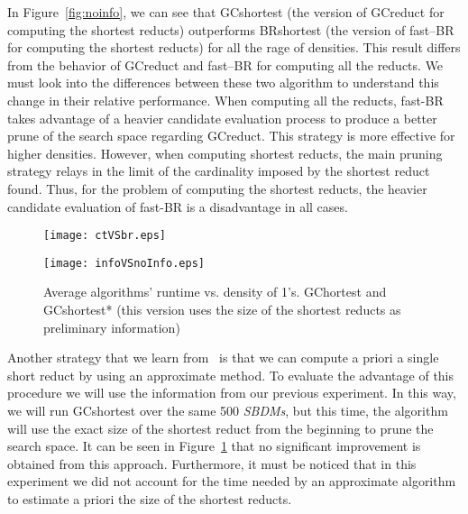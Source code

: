 \documentclass[authoryear,11pt]{elsarticle}
\begin{document}
  In Figure~\ref{fig:noinfo}, we can see that GCshortest (the version of GCreduct for computing the shortest reducts) outperforms BRshortest (the version of fast--BR for computing the shortest reducts) for all the rage of densities. This result differs from the behavior of GCreduct and fast--BR for computing all the reducts. We must look into the differences between these two algorithm to understand this change in their relative performance. When computing all the reducts, fast-BR takes advantage of a heavier candidate evaluation process to produce a better prune of the search space regarding GCreduct. This strategy is more effective for higher densities. However, when computing shortest reducts, the main pruning strategy relays in the limit of the cardinality imposed by the shortest reduct found. Thus, for the problem of computing the shortest reducts, the heavier candidate evaluation of fast-BR is a disadvantage in all cases.
  
  \begin{figure}[htb]
	  \begin{minipage}{.48\linewidth}  	
	  	\begin{center}
	  		\texttt{[image: ctVSbr.eps]}
	  	\end{center}
	  	\caption{Average algorithms' runtime vs. density of 1's.  ~~~~~~ GCshortest and BRshortest.\bigskip}
	  	\label{fig:noinfo}
	  \end{minipage}
	  \begin{minipage}{.48\linewidth}  
	  	\begin{center}
	  		\texttt{[image: infoVSnoInfo.eps]}
	  	\end{center}
	  	\caption{Average algorithms' runtime vs. density of 1's. GChortest and GCshortest* (this version uses the size of the shortest reducts as preliminary information)}
	  	\label{fig:info}
	  \end{minipage}
  \end{figure}  

 Another strategy that we learn from~\cite{Lin04} is that we can compute a priori a single short reduct by using an approximate method. To evaluate the advantage of this procedure we will use the information from our previous experiment. In this way, we will run GCshortest over the same 500 \textit{SBDMs}, but this time, the algorithm will use the exact size of the shortest reduct from the beginning to prune the search space. It can be seen in Figure~\ref{fig:info} that no significant improvement is obtained from this approach. Furthermore, it must be noticed that in this experiment we did not account for the time needed by an approximate algorithm to estimate a priori the size of the shortest reducts.
 
\end{document}
